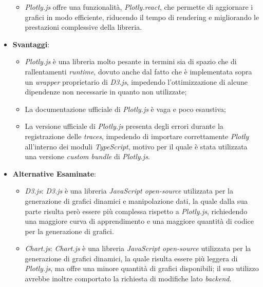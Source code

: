 \begin{itemize}
\begin{itemize}
              \item \textit{Plotly.js} offre una funzionalità, \textit{Plotly.react}, che permette di aggiornare i grafici in modo efficiente, riducendo il tempo di rendering
                    e migliorando le prestazioni complessive della libreria.
          \end{itemize}
    \item \textbf{Svantaggi}:
          \begin{itemize}
              \item \textit{Plotly.js} è una libreria molto pesante in termini sia di spazio che di rallentamenti \textit{\gls{runtime}\glox}, dovuto anche dal fatto che è implementata sopra un \textit{wrapper} proprietario di \textit{D3.js},
                    impedendo l'ottimizzazione di alcune dipendenze non necessarie in quanto non utilizzate;
              \item La documentazione ufficiale di \textit{Plotly.js} è vaga e poco esaustiva;
              \item La versione ufficiale di \textit{Plotly.js} presenta degli errori durante la registrazione delle \textit{traces}, impedendo di importare correttamente
                    \textit{Plotly} all'interno dei moduli \textit{TypeScript}, motivo per il quale è stata utilizzata una versione \textit{custom bundle} di \textit{Plotly.js}.
          \end{itemize}
    \item \textbf{Alternative Esaminate}:
          \begin{itemize}
              \item \textit{D3.js}: \textit{D3.js} è una libreria \textit{JavaScript open-source} utilizzata per la generazione di grafici dinamici e manipolazione dati, la quale dalla sua parte risulta però
                    essere più complessa rispetto a \textit{Plotly.js}, richiedendo una maggiore curva di apprendimento e una maggiore quantità di codice per la generazione di grafici.
              \item \textit{Chart.js}: \textit{Chart.js} è una libreria \textit{JavaScript open-source} utilizzata per la generazione di grafici dinamici, la quale risulta essere più leggera di \textit{Plotly.js},
                    ma offre una minore quantità di grafici disponibili; il suo utilizzo avrebbe inoltre comportato la richiesta di modifiche lato \textit{backend}.
          \end{itemize}
\end{itemize}


